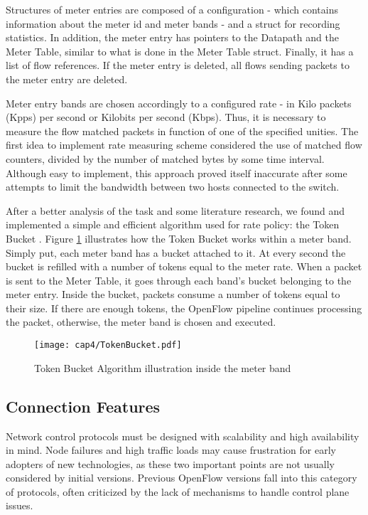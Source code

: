     Structures of meter entries are composed of a configuration - which contains information about the meter id and meter bands - and a struct for recording statistics. In addition, the meter entry has pointers to the Datapath and the Meter Table, similar to what is done in the Meter Table struct. Finally, it has a list of flow references. If the meter entry is deleted, all flows sending packets to the meter entry are deleted. 

    Meter entry bands are chosen accordingly to a configured rate - in Kilo packets (Kpps) per second or Kilobits per second (Kbps). Thus, it is necessary to measure the flow matched packets in function of one of the specified unities. The first idea to implement rate measuring scheme considered the use of matched flow counters, divided by the number of matched bytes by some time interval. Although easy to implement, this approach proved itself inaccurate after some attempts to limit the bandwidth between two hosts connected to the switch.  
    
    After a better analysis of the task and some literature research, we found and implemented a simple and efficient algorithm used for rate policy: the Token Bucket \cite{Tanenbaum:2002:CN:572404}. Figure \ref{fig:tokenbucket} illustrates how the Token Bucket works within a meter band. Simply put, each meter band has a bucket attached to it. At every second the bucket is refilled with a number of tokens equal to the meter rate. When a packet is sent to the Meter Table, it goes through each band's bucket belonging to the meter entry. Inside the bucket, packets consume a number of tokens equal to their size. If there are enough tokens, the OpenFlow pipeline continues processing the packet, otherwise, the meter band is chosen and executed.               

    \begin{figure}[h]
    \centering
    \texttt{[image: cap4/TokenBucket.pdf]}
    \caption{Token Bucket Algorithm illustration inside the meter band}
    \label{fig:tokenbucket}
    \end{figure}

\label{sec:sec44}

\subsection{Connection Features}
\label{sec:sec45}

    Network control protocols must be designed with scalability and high availability in mind. Node failures and high traffic loads may cause frustration for early adopters of new technologies, as these two important points are not usually considered by initial versions. Previous OpenFlow versions fall into this category of protocols, often criticized by the lack of mechanisms to handle control plane issues. 
    
